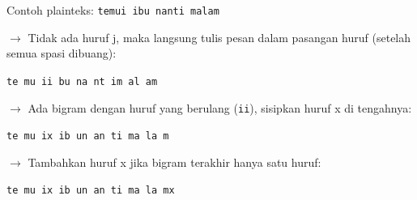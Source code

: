 \documentclass{article}
\begin{document}

Contoh plainteks: \texttt{temui ibu nanti malam}

$\rightarrow$ Tidak ada huruf j, maka langsung tulis pesan dalam pasangan huruf (setelah semua spasi dibuang):

\texttt{te mu ii bu na nt im al am}

$\rightarrow$ Ada bigram dengan huruf yang berulang (\texttt{ii}), sisipkan huruf x di tengahnya:

\texttt{te mu ix ib un an ti ma la m}

$\rightarrow$ Tambahkan huruf x jika bigram terakhir hanya satu huruf:

\texttt{te mu ix ib un an ti ma la mx}
\end{document}
